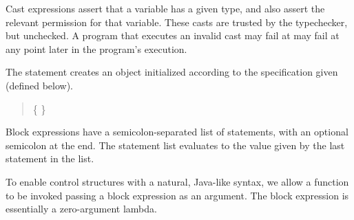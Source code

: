 Cast expressions assert that a variable has a given type, and
also assert the relevant permission for that variable.  These casts
are trusted by the typechecker, but unchecked. A program that executes 
an invalid cast may fail at may fail at any point later in the program's 
execution.


\begin{quote}


 {}

 {} 

 {}

\end{quote}

The  statement creates an object initialized according to the
 specification given (defined below).

\begin{quote}


 \{  \}


 {}  \opt{;}

\end{quote}

Block expressions have a semicolon-separated list of statements, with
an optional semicolon at the end.  The statement list evaluates to the
value given by the last statement in the list.

\begin{quote}


 {}

 {} 

\end{quote}

To enable control structures with a natural, Java-like syntax, we allow
a function to be invoked passing a block expression as an argument.  The
block expression is essentially a zero-argument lambda.


